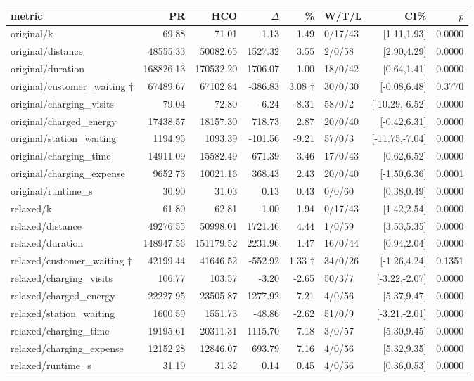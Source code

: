 \begin{tabular}{lrrrrlrr}
\toprule
metric & PR & HCO & $\Delta$ & \% & W/T/L & CI\% & $p$ \\
\midrule
original/k & 69.88 & 71.01 & 1.13 & 1.49 & 0/17/43 & [1.11,1.93] & 0.0000 \\
original/distance & 48555.33 & 50082.65 & 1527.32 & 3.55 & 2/0/58 & [2.90,4.29] & 0.0000 \\
original/duration & 168826.13 & 170532.20 & 1706.07 & 1.00 & 18/0/42 & [0.64,1.41] & 0.0000 \\
original/customer_waiting $\dagger$ & 67489.67 & 67102.84 & -386.83 & 3.08 $\dagger$ & 30/0/30 & [-0.08,6.48] & 0.3770 \\
original/charging_visits & 79.04 & 72.80 & -6.24 & -8.31 & 58/0/2 & [-10.29,-6.52] & 0.0000 \\
original/charged_energy & 17438.57 & 18157.30 & 718.73 & 2.87 & 20/0/40 & [-0.42,6.31] & 0.0000 \\
original/station_waiting & 1194.95 & 1093.39 & -101.56 & -9.21 & 57/0/3 & [-11.75,-7.04] & 0.0000 \\
original/charging_time & 14911.09 & 15582.49 & 671.39 & 3.46 & 17/0/43 & [0.62,6.52] & 0.0000 \\
original/charging_expense & 9652.73 & 10021.16 & 368.43 & 2.43 & 20/0/40 & [-1.50,6.36] & 0.0001 \\
original/runtime_s & 30.90 & 31.03 & 0.13 & 0.43 & 0/0/60 & [0.38,0.49] & 0.0000 \\
relaxed/k & 61.80 & 62.81 & 1.00 & 1.94 & 0/17/43 & [1.42,2.54] & 0.0000 \\
relaxed/distance & 49276.55 & 50998.01 & 1721.46 & 4.44 & 1/0/59 & [3.53,5.35] & 0.0000 \\
relaxed/duration & 148947.56 & 151179.52 & 2231.96 & 1.47 & 16/0/44 & [0.94,2.04] & 0.0000 \\
relaxed/customer_waiting $\dagger$ & 42199.44 & 41646.52 & -552.92 & 1.33 $\dagger$ & 34/0/26 & [-1.26,4.24] & 0.1351 \\
relaxed/charging_visits & 106.77 & 103.57 & -3.20 & -2.65 & 50/3/7 & [-3.22,-2.07] & 0.0000 \\
relaxed/charged_energy & 22227.95 & 23505.87 & 1277.92 & 7.21 & 4/0/56 & [5.37,9.47] & 0.0000 \\
relaxed/station_waiting & 1600.59 & 1551.73 & -48.86 & -2.62 & 51/0/9 & [-3.21,-2.01] & 0.0000 \\
relaxed/charging_time & 19195.61 & 20311.31 & 1115.70 & 7.18 & 3/0/57 & [5.30,9.45] & 0.0000 \\
relaxed/charging_expense & 12152.28 & 12846.07 & 693.79 & 7.16 & 4/0/56 & [5.32,9.35] & 0.0000 \\
relaxed/runtime_s & 31.19 & 31.32 & 0.14 & 0.45 & 4/0/56 & [0.36,0.53] & 0.0000 \\
\bottomrule
\end{tabular}
\par\vspace{0.4em}{\small $\dagger$ Customer-waiting mean paired \% is unstable; do not use it as a headline result.}
